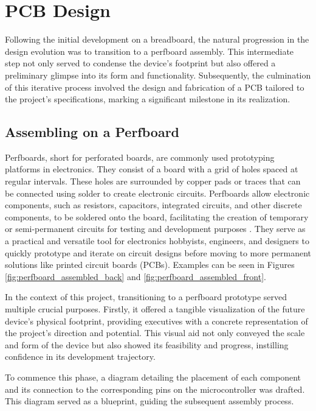 \chapter{PCB Design}
\label{cap:pcbdesign}

Following the initial development on a breadboard, the natural progression in the design evolution was to 
transition to a perfboard assembly. This intermediate step not only served to condense the device's 
footprint but also offered a preliminary glimpse into its form and functionality. Subsequently, the 
culmination of this iterative process involved the design and fabrication of a PCB tailored to the 
project's specifications, marking a significant milestone in its realization.


\section{Assembling on a Perfboard}

Perfboards, short for perforated boards, are commonly used prototyping platforms in electronics. They 
consist of a board with a grid of holes spaced at regular intervals. These holes are surrounded by copper 
pads or traces that can be connected using solder to create electronic circuits. Perfboards allow 
electronic components, such as resistors, capacitors, integrated circuits, and other discrete components, 
to be soldered onto the board, facilitating the creation of temporary or semi-permanent circuits for 
testing and development purposes \cite{perfboard}. They serve as a practical and versatile tool for 
electronics hobbyists, engineers, and designers to quickly prototype and iterate on circuit designs 
before moving to more permanent solutions like printed circuit boards (PCBs). Examples can be seen in 
Figures \ref{fig:perfboard_assembled_back} and \ref{fig:perfboard_assembled_front}.

In the context of this project, transitioning to a perfboard prototype served multiple crucial purposes. 
Firstly, it offered a tangible visualization of the future device's physical footprint, providing 
executives with a concrete representation of the project's direction and potential. This visual aid not 
only conveyed the scale and form of the device but also showed its feasibility and progress, instilling 
confidence in its development trajectory.

To commence this phase, a diagram detailing the placement of each component and its connection to the 
corresponding pins on the microcontroller was drafted. This diagram served as a blueprint, guiding the 
subsequent assembly process.

